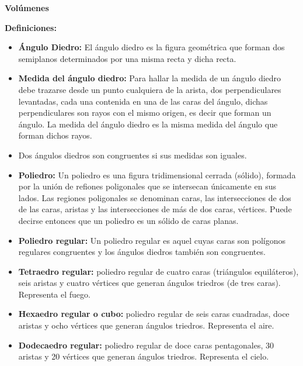\documentclass[•]{article}
\begin{document}
	\begin{huge}
		\begin{center}
			\textbf{Vol\'umenes}
		\end{center}
	\end{huge}
	
	
	\begin{flushleft}
	
		\textbf{Definiciones: }
		\begin{itemize}
			\item \textbf{\'Angulo Diedro: } El \'angulo diedro es la figura geom\'etrica que forman dos semiplanos determinados por una misma recta y dicha recta.
			
			\item \textbf{Medida del \'angulo diedro: } Para hallar la medida de un \'angulo diedro debe trazarse desde un punto cualquiera de la arista, dos perpendiculares levantadas, cada una contenida en una de las caras del \'angulo, dichas perpendiculares son rayos con el mismo origen, es decir que forman un \'angulo. La medida del \'angulo diedro es la misma medida del \'angulo que forman dichos rayos.
			
			\item Dos \'angulos diedros son congruentes si sus medidas son iguales.
			
			\item \textbf{Poliedro: } Un poliedro es una figura tridimensional cerrada (s\'olido), formada por la uni\'on de refiones poligonales que se intersecan \'unicamente en sus lados. Las regiones poligonales se denominan caras, las intersecciones de dos de las caras, aristas y las intersecciones de m\'as de dos caras, v\'ertices. Puede decirse entonces que un poliedro es un s\'olido de caras planas.
			
			\item \textbf{Poliedro regular: }Un poliedro regular es aquel cuyas caras son pol\'igonos regulares congruentes y los \'angulos diedros tambi\'en son congruentes. 
			\item \textbf{Tetraedro regular: }poliedro regular de cuatro caras (tri\'angulos equil\'ateros), seis aristas y cuatro v\'ertices que generan \'angulos triedros (de tres caras). Representa el fuego.
			
			\item \textbf{Hexaedro regular o cubo: }poliedro regular de seis caras cuadradas, doce aristas y ocho v\'ertices que generan \'angulos triedros. Representa el aire.
			\item \textbf{Dodecaedro regular: }poliedro regular de doce caras pentagonales, 30 aristas y 20 v\'ertices que generan \'angulos triedros. Representa el cielo.
			

\end{itemize}
\end{flushleft}
\end{document}
